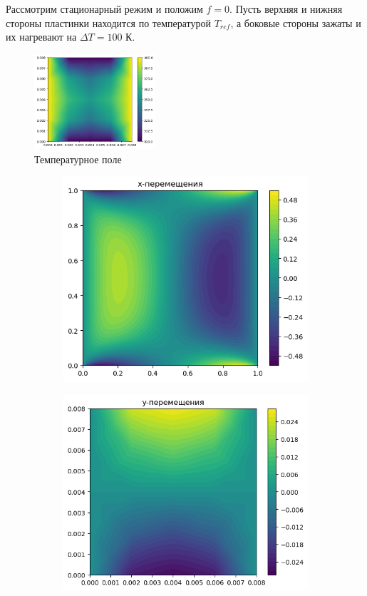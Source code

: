 \documentclass[12pt, a4paper]{article}
\begin{document}
Рассмотрим стационарный режим и положим $f=0$. Пусть верхняя и нижняя стороны пластинки находится по температурой $T_{ref}$, а боковые стороны зажаты и их нагревают на $\Delta T=100$ К.
 	\begin{figure}[H]
	\centering
	\includegraphics[width=0.4\textwidth]{tempreture1}
	\caption{Температурное поле}
\end{figure}
	\begin{figure}[H]
		\centering
		\begin{subfigure}[H]{0.4\textwidth}
			\includegraphics[width=\textwidth]{horiz1}
		\end{subfigure}
		\qquad\qquad
		\begin{subfigure}[H]{0.4\textwidth}
			\includegraphics[width=\textwidth]{vert1}

\end{subfigure}
\end{figure}
\end{document}
